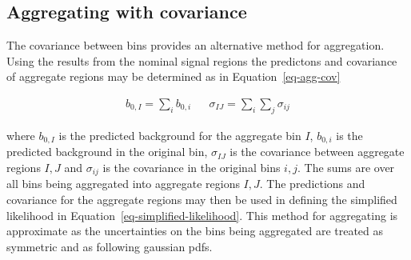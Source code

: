 \subsection{Aggregating with covariance}

The covariance between bins provides an alternative method for aggregation. 
Using the results from the nominal signal regions the predictons and covariance of aggregate regions
may be determined as in Equation~\ref{eq-agg-cov}

\begin{align}
b_{0,I} = \sum_i b_{0,i} && \sigma_{IJ}=\sum_i\sum_j\sigma_{ij}
\label{eq-agg-cov}
\end{align}

where $b_{0,I}$ is the predicted background for the aggregate bin $I$,
$b_{0,i}$ is the predicted background in the original bin, $\sigma_{IJ}$
is the covariance between aggregate regions $I,J$ and $\sigma_{ij}$ is
the covariance in the original bins $i,j$. The sums are over all
bins being aggregated into aggregate regions $I,J$. The predictions
and covariance for the aggregate regions may then be used in defining 
the simplified likelihood in Equation~\ref{eq-simplified-likelihood}.
This method for aggregating is approximate as the uncertainties
on the bins being aggregated are treated as symmetric and as following
gaussian pdfs.



